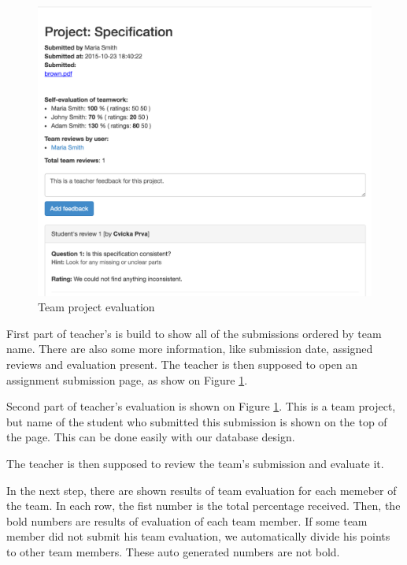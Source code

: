 \begin{figure}[h]
    \centering
    \includegraphics[width=\textwidth]{images/teamprojectevaluation.png}
    \caption{Team project evaluation}
    \label{team_submission_admin}
\end{figure}

First part of teacher's is build to show all of the submissions ordered by team name. There are also some more information, like submission date, assigned reviews and evaluation present. The teacher is then supposed to open an assignment submission page, as show on Figure \ref{team_submission_admin}.


Second part of teacher's evaluation is shown on Figure \ref{team_submission_admin}. This is a team project, but name of the student who submitted this submission is shown on the top of the page. This can be done easily with our database design. 

The teacher is then supposed to review the team's submission and evaluate it. 

In the next step, there are shown results of team evaluation for each memeber of the team. In each row, the fist number is the total percentage received. Then, the bold numbers are results of evaluation of each team member. If some team member did not submit his team evaluation, we automatically divide his points to other team members. These auto generated numbers are not bold.

